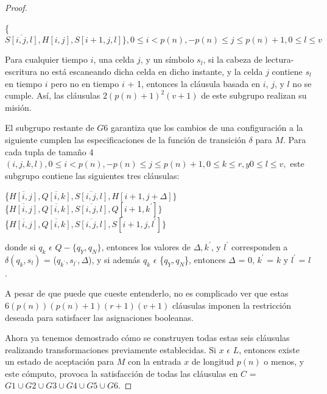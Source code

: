 \documentclass[a4paper, spanish, utf8]{memoir}
\begin{document}
\begin{proof}
  \begin{center} {

      \{$\overline{S[i,j,l]}, H[i,j], S[i+1,j,l]\}, 0 \le i < p(n), -p(n) \le j \le p(n) + 1, 0 \le l \le v $

    }
  \end{center}


  Para cualquier tiempo $i$, una celda $j$, y un símbolo $ s_l $, si la cabeza
  de lectura-escritura no está escaneando dicha celda en dicho instante, y la
  celda $j$ contiene $ s_l $ en tiempo $i$ pero no en tiempo $i$ + 1, entonces
  la cláusula basada en $i$, $j$, y $l$ no se cumple. Así, las cláusulas $ 2 (p
  (n) + 1)^{2} (v + 1) $ de este subgrupo realizan su misión.


  El subgrupo restante de $G6$ garantiza que los cambios de una configuración a
  la siguiente cumplen las especificaciones de la función de transición $\delta$
  para $M$. Para cada tupla de tamaño 4 $(i,j,k,l), 0 \le i < p(n), -p(n) \le j
  \le p(n) + 1, 0 \le k \le r, y 0 \le l \le v,$ este subgrupo contiene las
  siguientes tres cláusulas:

  \begin{center} {

      \{$\overline{H[i,j]}, \overline{Q[i,k]}, \overline{S[i,j,l]}, H[i+1,j+\Delta]\} $ \\
      \{$\overline{H[i,j]}, \overline{Q[i,k]}, \overline{S[i,j,l]}, Q[i+1,k^{'}]\} $ \\
      \{$\overline{H[i,j]}, \overline{Q[i,k]}, \overline{S[i,j,l]}, S[i+1,j,l^{'}]\} $

    }
  \end{center}


  donde si $q_k$  $\epsilon$  $Q - \{q_Y,q_N\}$, entonces los valores de
  $\Delta, k^{'}$, y $l^{'}$ corresponden a $\delta(q_k,s_l)$ =
  ($q_{k^{'}},s_{l^{'}},\Delta$), y si además $q_k$ $\epsilon$ \{$q_Y,q_N$\},
  entonces $\Delta$ = 0, $k^{'}$ = $k$ y $l^{'}$ = $l$.

  A pesar de que puede que cueste entenderlo, no es complicado ver que estas
  $6(p(n))(p(n) + 1)(r + 1)(v + 1)$ cláusulas imponen la restricción deseada
  para satisfacer las asignaciones booleanas.

  Ahora ya tenemos demostrado cómo se construyen todas estas seis cláusulas
  realizando transformaciones previamente establecidas. Si $x$ $\epsilon$ $L$,
  entonces existe un estado de aceptación para $M$ con la entrada $x$ de
  longitud $p(n)$ o menos, y este cómputo, provoca la satisfacción de todas las
  cláusulas en $C$ = $G1 \cup G2 \cup G3 \cup G4 \cup G5 \cup G6$.


\end{proof}
\end{document}
